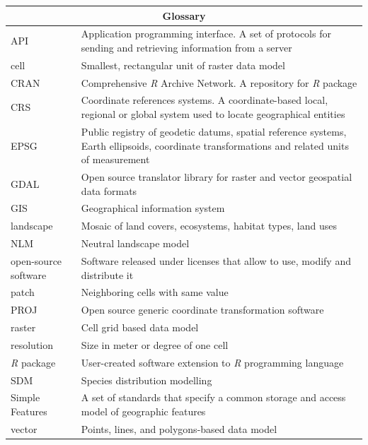 \documentclass[smallextended]{svjour3}       %
\begin{document}
\begin{tabularx}{1.15\textwidth}{lX}

\hline

\multicolumn{2}{c}{Glossary} \\

\hline

API & Application programming interface. A set of protocols for sending and retrieving information from a server \\
cell & Smallest, rectangular unit of raster data model \\
CRAN & Comprehensive \textit{R} Archive Network. A repository for \textit{R} package \\
CRS & Coordinate references systems. A coordinate-based local, regional or global system used to locate geographical entities \\
EPSG & Public registry of geodetic datums, spatial reference systems, Earth ellipsoids, coordinate transformations and related units of measurement \\
GDAL & Open source translator library for raster and vector geospatial data formats \\
GIS & Geographical information system \\
landscape & Mosaic of land covers, ecosystems, habitat types, land uses \\
NLM & Neutral landscape model \\
open-source software & Software released under licenses that allow to use, modify and distribute it \\
patch & Neighboring cells with same value \\
PROJ & Open source generic coordinate transformation software \\
raster & Cell grid based data model \\
resolution & Size in meter or degree of one cell \\
\textit{R} package & User-created software extension to \textit{R} programming language \\
SDM & Species distribution modelling \\
Simple Features & A set of standards that specify a common storage and access model of geographic features \\
vector & Points, lines, and polygons-based data model \\

\hline

\end{tabularx}
\end{document}
